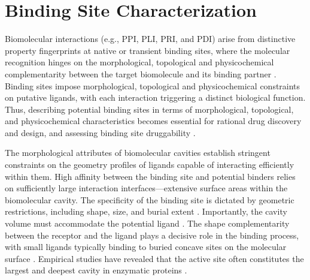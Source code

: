 \documentclass[Ingles]{phdthesis}
\def\eg{e.g.\onedot}
\begin{document}
\section{Binding Site Characterization \label{sec:biomolecular-characterization}}


Biomolecular interactions (\eg, \acs{PPI}, \acs{PLI}, \acs{PRI}, and \acs{PDI}) arise from distinctive property fingerprints at native or transient binding sites, where the molecular recognition hinges on the morphological, topological and physicochemical complementarity between the target biomolecule and its binding partner \cite{sotriffer2002,henrich2010,guerra2019,krone2016}. Binding sites impose morphological, topological and physicochemical constraints on putative ligands, with each interaction triggering a distinct biological function. Thus, describing potential binding sites in terms of morphological, topological, and physicochemical characteristics becomes essential for rational drug discovery and design, and assessing binding site druggability \cite{hubbard1994,liang1998,guerra2019,krone2016}.

The morphological attributes of biomolecular cavities establish stringent constraints on the geometry profiles of ligands capable of interacting efficiently within them. High affinity between the binding site and potential binders relies on sufficiently large interaction interfaces---extensive surface areas within the biomolecular cavity. The specificity of the binding site is dictated by geometric restrictions, including shape, size, and burial extent \cite{laskowski1996,liang1998}. Importantly, the cavity volume must accommodate the potential ligand \cite{stank2016}. The shape complementarity between the receptor and the ligand plays a decisive role in the binding process, with small ligands typically binding to buried concave sites on the molecular surface \cite{henrich2010}. Empirical studies have revealed that the active site often constitutes the largest and deepest cavity in enzymatic proteins \cite{laskowski1996}.
\end{document}
